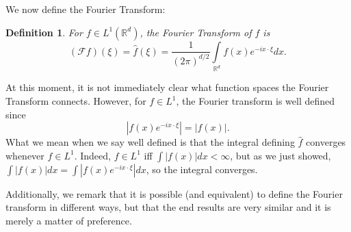 \documentclass[letterpaper,twoside,12pt]{article}
\theoremstyle{mystyle}
\newtheorem{definition}{Definition}[section]
\newcommand{\R}{{\mathbb R}}
\newcommand{\cg}{\color{gray}}
\newcommand{\cbk}{\color{black}}
\begin{document}
We now define the Fourier Transform: 
\begin{definition}
  For $f \in L^1\left( \R^d \right)$, the Fourier Transform of $f$ is 
  \[\left( \mathcal F f \right)\left( \xi \right) =\hat f \left( \xi  \right)= \frac{1}{\left( 2\pi  \right)^{d/2}} \int\limits_{\R^d } f(x) e^{-ix\cdot \xi} dx.\]
\end{definition}
At this moment, it is not immediately clear what function spaces the Fourier Transform connects. However, for $f \in L^1$, the Fourier transform is well defined since 
\[\left\vert f(x) e^{- ix\cdot \xi} \right\vert = |f(x)|.\]
\cg What we mean when we say well defined is that the integral defining $\hat f$ converges whenever $f \in L^1$. Indeed, $f \in L^1$ iff $\int |f(x)| dx < \infty$, but as we just showed, $\int |f(x) | dx = \int \left\vert f(x) e^{- ix\cdot \xi} \right\vert dx$, so the integral converges. \cbk 

Additionally, we remark that it is possible (and equivalent) to define the Fourier transform in different ways, but that the end results are very similar and it is merely a matter of preference. 
\end{document}
